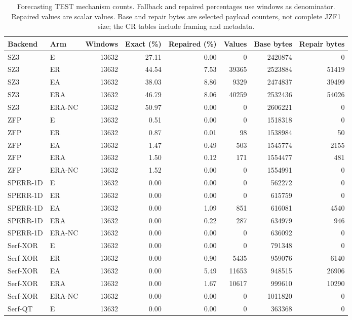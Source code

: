 \begin{table}[t]
\centering
\small
\setlength{\tabcolsep}{5pt}
\caption{Forecasting TEST mechanism counts. Fallback and repaired percentages use windows as denominator. Repaired values are scalar values. Base and repair bytes are selected payload counters, not complete JZF1 size; the CR tables include framing and metadata.}
\label{tab:s-ablation-mechanism-forecast}
\begin{tabular}{@{}llrrrrrr@{}}
\toprule
Backend & Arm & Windows & Exact (\%) & Repaired (\%) & Values & Base bytes & Repair bytes \\
\midrule
SZ3 & E & 13632 & 27.11 & 0.00 & 0 & 2420874 & 0 \\
SZ3 & ER & 13632 & 44.54 & 7.53 & 39365 & 2523884 & 51419 \\
SZ3 & EA & 13632 & 38.03 & 8.86 & 9329 & 2474837 & 39499 \\
SZ3 & ERA & 13632 & 46.79 & 8.06 & 40259 & 2532436 & 54026 \\
SZ3 & ERA-NC & 13632 & 50.97 & 0.00 & 0 & 2606221 & 0 \\
ZFP & E & 13632 & 0.51 & 0.00 & 0 & 1518318 & 0 \\
ZFP & ER & 13632 & 0.87 & 0.01 & 98 & 1538984 & 50 \\
ZFP & EA & 13632 & 1.47 & 0.49 & 503 & 1545774 & 2155 \\
ZFP & ERA & 13632 & 1.50 & 0.12 & 171 & 1554477 & 481 \\
ZFP & ERA-NC & 13632 & 1.52 & 0.00 & 0 & 1554991 & 0 \\
SPERR-1D & E & 13632 & 0.00 & 0.00 & 0 & 562272 & 0 \\
SPERR-1D & ER & 13632 & 0.00 & 0.00 & 0 & 615759 & 0 \\
SPERR-1D & EA & 13632 & 0.00 & 1.09 & 851 & 616081 & 4540 \\
SPERR-1D & ERA & 13632 & 0.00 & 0.22 & 287 & 634979 & 946 \\
SPERR-1D & ERA-NC & 13632 & 0.00 & 0.00 & 0 & 636092 & 0 \\
Serf-XOR & E & 13632 & 0.00 & 0.00 & 0 & 791348 & 0 \\
Serf-XOR & ER & 13632 & 0.00 & 0.90 & 5435 & 959076 & 6140 \\
Serf-XOR & EA & 13632 & 0.00 & 5.49 & 11653 & 948515 & 26906 \\
Serf-XOR & ERA & 13632 & 0.00 & 1.67 & 10617 & 999610 & 10290 \\
Serf-XOR & ERA-NC & 13632 & 0.00 & 0.00 & 0 & 1011820 & 0 \\
Serf-QT & E & 13632 & 0.00 & 0.00 & 0 & 363368 & 0 \\

\end{tabular}
\end{table}
